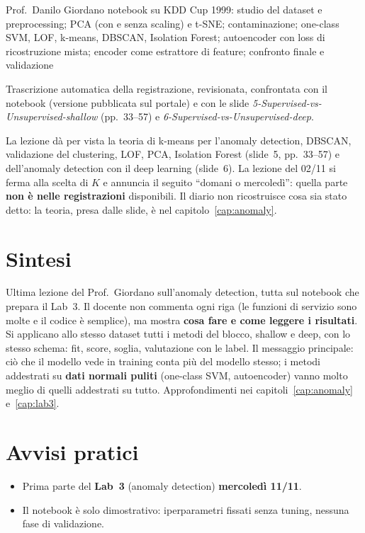   {Prof.~Danilo Giordano}
  {notebook  su KDD Cup 1999: studio del dataset e preprocessing; PCA (con e senza
   scaling) e t-SNE; contaminazione; one-class SVM, LOF, k-means, DBSCAN, Isolation Forest; autoencoder con
   loss di ricostruzione mista; encoder come estrattore di feature; confronto finale e validazione}
\label{lez:2026-11-09}

\begin{nota}[Fonte]
Trascrizione automatica della registrazione, revisionata, confrontata con il notebook
 (versione pubblicata sul portale) e con le slide
\emph{5-Supervised-vs-Unsupervised-shallow} (pp.~33--57) e \emph{6-Supervised-vs-Unsupervised-deep}.
\end{nota}

\begin{verifica}
La lezione dà per vista la teoria di k-means per l'anomaly detection, DBSCAN, validazione del clustering,
LOF, PCA, Isolation Forest (slide~5, pp.~33--57) e dell'anomaly detection con il deep learning (slide~6).
La lezione del 02/11 si ferma alla scelta di $K$ e annuncia il seguito ``domani o mercoledì'': quella
parte \textbf{non è nelle registrazioni} disponibili. Il diario non ricostruisce cosa sia stato detto: la
teoria, presa dalle slide, è nel capitolo~\ref{cap:anomaly}.
\end{verifica}

\section{Sintesi}
Ultima lezione del Prof.~Giordano sull'anomaly detection, tutta sul notebook che prepara il Lab~3. Il
docente non commenta ogni riga (le funzioni di servizio sono molte e il codice è semplice), ma mostra
\textbf{cosa fare e come leggere i risultati}. Si applicano allo stesso dataset tutti i metodi del blocco,
shallow e deep, con lo stesso schema: fit, score, soglia, valutazione con le label. Il messaggio
principale: ciò che il modello vede in training conta più del modello stesso; i metodi addestrati su
\textbf{dati normali puliti} (one-class SVM, autoencoder) vanno molto meglio di quelli addestrati su
tutto. Approfondimenti nei capitoli~\ref{cap:anomaly} e~\ref{cap:lab3}.

\section{Avvisi pratici}
\begin{itemize}
  \item Prima parte del \textbf{Lab~3} (anomaly detection) \textbf{mercoledì 11/11}.
  \item Il notebook è solo dimostrativo: iperparametri fissati senza tuning, nessuna fase di validazione.
\end{itemize}

